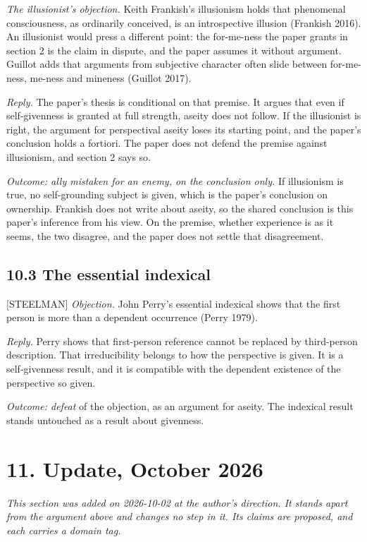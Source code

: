 \documentclass[11pt]{article}
\newcommand{\register}[1]{{\ttfamily\small #1}}
\begin{document}
\emph{The illusionist's objection.} Keith Frankish's illusionism holds that phenomenal consciousness, as ordinarily conceived, is an introspective illusion (Frankish 2016). An illusionist would press a different point: the for-me-ness the paper grants in section 2 is the claim in dispute, and the paper assumes it without argument. Guillot adds that arguments from subjective character often slide between for-me-ness, me-ness and mineness (Guillot 2017).

\emph{Reply.} The paper's thesis is conditional on that premise. It argues that even if self-givenness is granted at full strength, aseity does not follow. If the illusionist is right, the argument for perspectival aseity loses its starting point, and the paper's conclusion holds a fortiori. The paper does not defend the premise against illusionism, and section 2 says so.

\emph{Outcome: ally mistaken for an enemy, on the conclusion only.} If illusionism is true, no self-grounding subject is given, which is the paper's conclusion on ownership. Frankish does not write about aseity, so the shared conclusion is this paper's inference from his view. On the premise, whether experience is as it seems, the two disagree, and the paper does not settle that disagreement.

\subsection*{10.3 The essential indexical}

\register{[STEELMAN]} \emph{Objection.} John Perry's essential indexical shows that the first person is more than a dependent occurrence (Perry 1979).

\emph{Reply.} Perry shows that first-person reference cannot be replaced by third-person description. That irreducibility belongs to how the perspective is given. It is a self-givenness result, and it is compatible with the dependent existence of the perspective so given.

\emph{Outcome: defeat} of the objection, as an argument for aseity. The indexical result stands untouched as a result about givenness.

\section*{11. Update, October 2026}

\emph{This section was added on 2026-10-02 at the author's direction. It stands apart from the argument above and changes no step in it. Its claims are proposed, and each carries a domain tag.}
\end{document}
